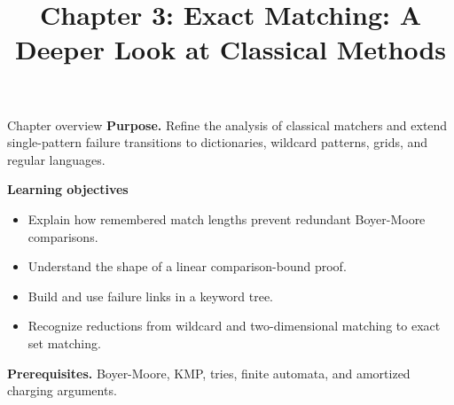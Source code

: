 \documentclass[11pt,letterpaper]{article}
\title{Chapter 3: Exact Matching: A Deeper Look at Classical Methods}
\author{}
\date{}
\begin{document}
\maketitle

\begin{CornellOverviewBox}{Chapter overview}
\textbf{Purpose.} Refine the analysis of classical matchers and extend single-pattern failure transitions to dictionaries, wildcard patterns, grids, and regular languages.

\textbf{Learning objectives}
\begin{itemize}
  \item Explain how remembered match lengths prevent redundant Boyer-Moore comparisons.
  \item Understand the shape of a linear comparison-bound proof.
  \item Build and use failure links in a keyword tree.
  \item Recognize reductions from wildcard and two-dimensional matching to exact set matching.
\end{itemize}

\textbf{Prerequisites.} Boyer-Moore, KMP, tries, finite automata, and amortized charging arguments.
\end{CornellOverviewBox}
\end{document}
